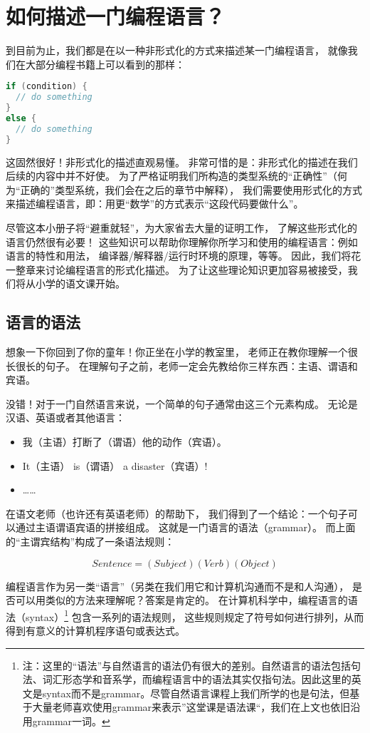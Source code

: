 \documentclass[../main.tex]{subfiles}
\begin{document}
  \section{如何描述一门编程语言？}
  \indent 到目前为止，我们都是在以一种非形式化的方式来描述某一门编程语言，
  就像我们在大部分编程书籍上可以看到的那样：

\begin{lstlisting}[language=c]
if (condition) {
  // do something
}
else {
  // do something
}
\end{lstlisting}

  \indent 这固然很好！非形式化的描述直观易懂。
  非常可惜的是：非形式化的描述在我们后续的内容中并不好使。
  为了严格证明我们所构造的类型系统的“正确性”（何为“正确的”类型系统，我们会在之后的章节中解释），
  我们需要使用形式化的方式来描述编程语言，即：用更“数学”的方式表示“这段代码要做什么”。

  \indent 尽管这本小册子将“避重就轻”，为大家省去大量的证明工作，
  了解这些形式化的语言仍然很有必要！
  这些知识可以帮助你理解你所学习和使用的编程语言：例如语言的特性和用法，
  编译器/解释器/运行时环境的原理，等等。\cite{edu}
  因此，我们将花一整章来讨论编程语言的形式化描述。
  为了让这些理论知识更加容易被接受，我们将从小学的语文课开始。

  \subsection{语言的语法}
  \indent 想象一下你回到了你的童年！你正坐在小学的教室里，
  老师正在教你理解一个很长很长的句子。
  在理解句子之前，老师一定会先教给你三样东西：主语、谓语和宾语。
  
  \indent 没错！对于一门自然语言来说，一个简单的句子通常由这三个元素构成。
  无论是汉语、英语或者其他语言：

  \begin{itemize}
    \item 我（主语）打断了（谓语）他的动作（宾语）。
    \item It（主语） is（谓语） a disaster（宾语）!
    \item ……
  \end{itemize}

  \indent 在语文老师（也许还有英语老师）的帮助下，
  我们得到了一个结论：一个句子可以通过主语谓语宾语的拼接组成。
  这就是一门语言的语法（grammar）。
  而上面的“主谓宾结构”构成了一条语法规则：

  $$Sentence = (Subject) (Verb) (Object)$$
  
  \indent 编程语言作为另一类“语言”（另类在我们用它和计算机沟通而不是和人沟通），
  是否可以用类似的方法来理解呢？答案是肯定的。
  在计算机科学中，编程语言的语法（syntax）\footnote[1]{注：这里的“语法”与自然语言的语法仍有很大的差别。自然语言的语法包括句法、词汇形态学和音系学\cite{grammar}，而编程语言中的语法其实仅指句法。因此这里的英文是syntax而不是grammar。尽管自然语言课程上我们所学的也是句法，但基于大量老师喜欢使用grammar来表示”这堂课是语法课“，我们在上文也依旧沿用grammar一词。}
  包含一系列的语法规则，
  这些规则规定了符号如何进行排列，从而得到有意义的计算机程序语句或表达式。\cite{syntaxwiki}
\end{document}
